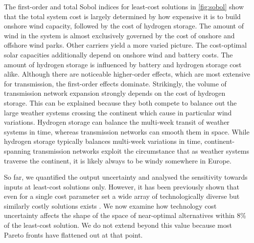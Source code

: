 The first-order and total Sobol indices for least-cost solutions in
\cref{fig:sobol} show that the total system cost is largely determined by how
expensive it is to build onshore wind capacity, followed by the cost of hydrogen
storage. The amount of wind in the system is almost exclusively governed by the
cost of onshore and offshore wind parks. Other carriers yield a more varied
picture. The cost-optimal solar capacities additionally depend on onshore wind
and battery costs. The amount of hydrogen storage is influenced by battery and
hydrogen storage cost alike. Although there are noticeable higher-order effects,
which are most extensive for transmission, the first-order effects dominate.
Strikingly, the volume of transmission network expansion strongly depends on the
cost of hydrogen storage. This can be explained because they both compete to
balance out the large weather systems crossing the continent which cause in
particular wind variations. Hydrogen storage can balance the multi-week transit
of weather systems in time, whereas transmission networks can smooth them in space.
While hydrogen storage typically balances multi-week variations in time,
continent-spanning transmission networks exploit the circumstance that as
weather systems traverse the continent, it is likely always to be windy
somewhere in Europe.


So far, we quantified the output uncertainty and analysed the sensitivity
towards inputs at least-cost solutions only. However, it has been previously
shown that even for a single cost parameter set a wide array of technologically
diverse but similarly costly solutions exists \cite{nearoptimal}. We now examine
how technology cost uncertainty affects the shape of the space of near-optimal
alternatives within 8\% of the least-cost solution. We do not extend beyond this
value because most Pareto fronts have flattened out at that point.


